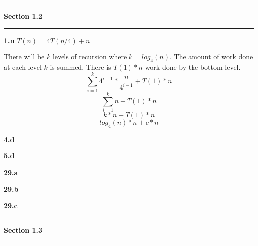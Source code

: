 \documentclass[11pt]{article}
\newcommand\question[1]{\vspace{.25in}\hrule\textbf{#1}\vspace{.5em}\hrule\vspace{.10in}}
\renewcommand\part[1]{\Large\vspace{.10in}\textbf{#1}\vspace{.10in}\normalsize\newline}
\begin{document}

\question{Section 1.2} %

\part{1.n} 
$T(n) = 4T(n/4) + n$

There will be $k$ levels of recursion where $k = log_4(n)$. The amount of work done at each level $k$ is summed. There is $T(1) * n$ work done by the bottom level.
$$\sum\limits_{i=1}^k 4^{i-1} * \frac{n}{4^{i-1}} + T(1) * n$$ 
$$\sum\limits_{i=1}^k n + T(1) * n$$
$$k * n + T(1) * n$$
$$log_4(n) * n + c * n$$


\part{4.d} %

\part{5.d}

\part{29.a}

\part{29.b}

\part{29.c}

\question{Section 1.3}
\end{document}
